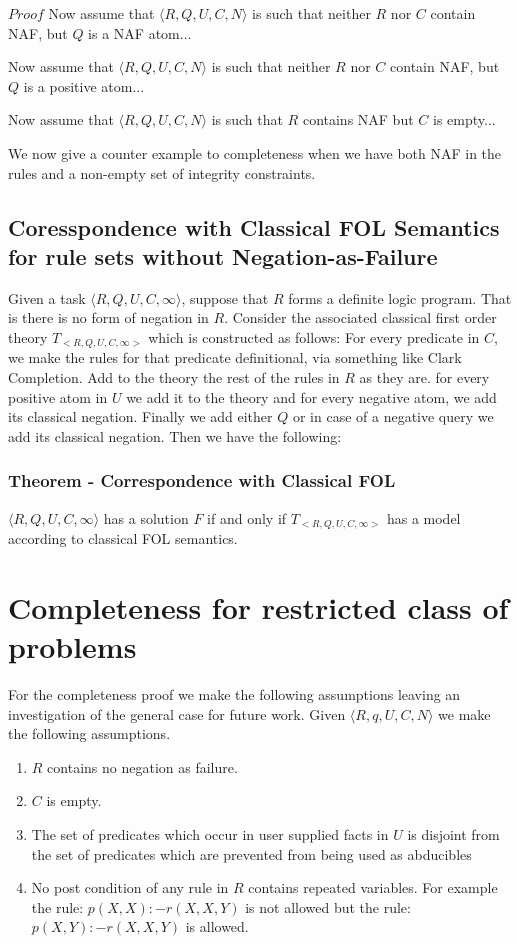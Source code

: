 $Proof$ Now assume that $\langle R,Q,U,C,N\rangle$ is such that neither $R$ nor $C$ contain NAF, but $Q$ is a NAF atom...

Now assume that $\langle R,Q,U,C,N\rangle$ is such that neither $R$ nor $C$ contain NAF, but $Q$ is a positive atom...

Now assume that $\langle R,Q,U,C,N\rangle$ is such that $R$ contains NAF but $C$ is empty...

We now give a counter example to completeness when we have both NAF in the rules and a non-empty set of integrity constraints.

\subsection{Coresspondence with Classical FOL Semantics for rule sets without Negation-as-Failure}

Given a task $\langle R,Q,U,C,\infty\rangle$, suppose that $R$ forms a definite logic
program. That is there is no form of negation in $R$. Consider the associated
classical first order theory $T_{<R,Q,U,C,\infty>}$ which is constructed as
follows: For every predicate in $C$, we make the rules for that predicate
definitional, via something like Clark Completion. Add to the theory the rest
of the rules in $R$ as they are. for every positive atom in $U$ we add it to
the theory and for every negative atom, we add its classical negation. Finally
we add either $Q$ or in case of a negative query we add its classical
negation. Then we have the following:

\subsubsection{Theorem - Correspondence with Classical FOL}
$\langle R,Q,U,C,\infty\rangle$ has a solution $F$ if and only if $T_{<R,Q,U,C,\infty>}$ has a model according to classical FOL semantics.



\section{Completeness for restricted class of problems}
For the completeness proof we make the following assumptions leaving an investigation of the general case for future work. Given $\langle R,q,U,C,N\rangle$ we make the following assumptions.

\begin{enumerate}
\item $R$ contains no negation as failure.
\item $C$ is empty.
\item The set of predicates which occur in user supplied facts in $U$ is
  disjoint from the set of predicates which are prevented from being used as
  abducibles
\item No post condition of any rule in $R$ contains repeated variables. For example the rule:
$p(X,X):-r(X,X,Y)$ is not allowed but the rule: $p(X,Y):-r(X,X,Y)$ is allowed.
\end{enumerate}

